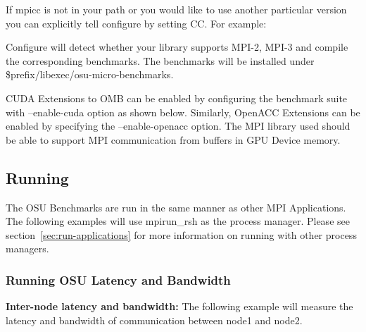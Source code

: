 
\noindent If mpicc is not in your path or you would like to use another particular
version you can explicitly tell configure by setting CC. For example:


\noindent Configure will detect whether your library supports MPI-2, MPI-3 and
compile the corresponding benchmarks. The benchmarks will be installed under 
\$prefix/libexec/osu-micro-benchmarks.

\noindent CUDA Extensions to OMB can be enabled by configuring the benchmark
suite with --enable-cuda option as shown below.  Similarly, OpenACC Extensions
can be enabled by specifying the --enable-openacc option.  The MPI library used
should be able to support MPI communication from buffers in GPU Device memory.


\subsection{Running}
The OSU Benchmarks are run in the same manner as other MPI Applications.  The
following examples will use mpirun\_rsh as the process manager.  Please see
section~\ref{sec:run-applications} for more information on running with other
process managers.

\subsubsection{Running OSU Latency and Bandwidth}

\noindent\textbf{Inter-node latency and bandwidth:} The following
example will measure the latency and bandwidth of communication between
node1 and node2.

